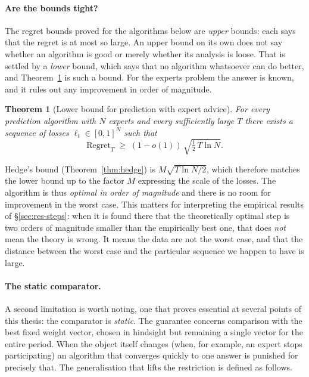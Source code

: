 \documentclass[12pt,a4paper,oneside]{report}
\renewcommand{\_}{\oldunderscore\allowbreak}
\theoremstyle{definition}
\theoremstyle{plain}
\newtheorem{theorem}{Theorem}[chapter]
\theoremstyle{definition}   %
\begin{document}
\paragraph{Are the bounds tight?} The regret bounds proved for the algorithms below are
\emph{upper} bounds: each says that the regret is at most so large. An upper bound on its own
does not say whether an algorithm is good or merely whether its analysis is loose. That is
settled by a \emph{lower} bound, which says that no algorithm whatsoever can do better, and
Theorem~\ref{thm:lower-bound} is such a bound.
For the experts problem the answer is known, and it rules out any improvement in order of
magnitude.

\begin{theorem}[Lower bound for prediction with expert advice]
\label{thm:lower-bound}
For every prediction algorithm with $N$ experts and every sufficiently large $T$ there exists a
sequence of losses $\ell_t \in [0,1]^N$ such that
\[
\mathrm{Regret}_T \;\geq\; (1-o(1))\,\sqrt{\tfrac{1}{2}\,T \ln N}.
\]
\end{theorem}

Hedge's bound (Theorem~\ref{thm:hedge}) is $M\sqrt{T\ln N/2}$, which therefore matches the
lower bound up to the factor $M$ expressing the scale of the losses. The algorithm is thus
\emph{optimal in order of magnitude} and there is no room for improvement in the worst case.
This matters for interpreting the empirical results of \S\ref{sec:res-steps}: when it is found
there that the theoretically optimal step is two orders of magnitude smaller than the
empirically best one, that does \emph{not} mean the theory is wrong. It means the data are not
the worst case, and that the distance between the worst case and the particular sequence we
happen to have is large.

\paragraph{The static comparator.} A second limitation is worth noting, one that proves
essential at several points of this thesis: the comparator is \emph{static}. The guarantee
concerns comparison with the best fixed weight vector, chosen in hindsight but remaining a
single vector for the entire period. When the object itself changes (when, for example, an
expert stops participating) an algorithm that converges quickly to one answer is punished for
precisely that. The generalisation that lifts the restriction is defined as follows.
\end{document}
